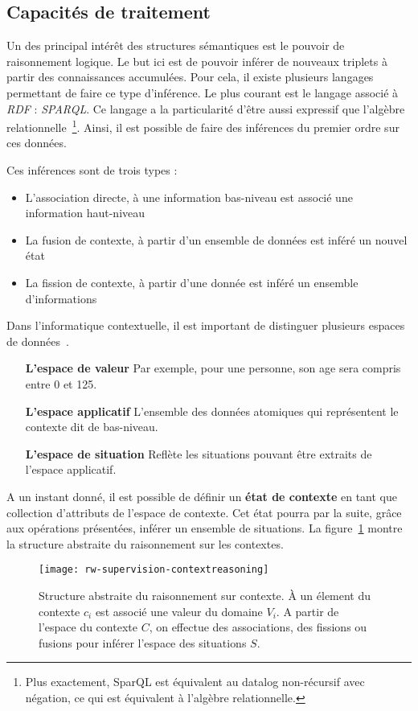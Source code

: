 \subsection{Capacités de traitement}
Un des principal intérêt des structures sémantiques est le pouvoir de raisonnement logique. Le but ici est de pouvoir inférer de nouveaux triplets à partir des connaissances accumulées. Pour cela, il existe plusieurs langages permettant de faire ce type d'inférence. Le plus courant est le langage associé à \textit{RDF} : \textit{SPARQL}. Ce langage a la particularité d'être aussi expressif que l'algèbre relationnelle~\cite{Angles:sparql}\footnote{Plus exactement, SparQL est équivalent au datalog non-récursif avec négation, ce qui est équivalent à l'algèbre relationnelle.}. Ainsi, il est possible de faire des inférences du premier ordre sur ces données.

Ces inférences sont de trois types :
\begin{itemize}
 \item L'association directe, à une information bas-niveau est associé une information haut-niveau 
 \item La fusion de contexte, à partir d'un ensemble de données est inféré un nouvel état 
 \item La fission de contexte, à partir d'une donnée est inféré un ensemble d'informations
\end{itemize}

Dans l'informatique contextuelle, il est important de distinguer plusieurs espaces de données~\cite{Padovitz:agent}. 
\begin{itemize}
 \item[\textbf{L'espace de valeur}] Par exemple, pour une personne, son age sera compris entre 0 et 125.
 \item[\textbf{L'espace applicatif}] L'ensemble des données atomiques qui représentent le contexte dit de bas-niveau.
 \item[\textbf{L'espace de situation}] Reflète les situations pouvant être extraits de l'espace applicatif.
\end{itemize}

A un instant donné, il est possible de définir un \textbf{état de contexte} en tant que collection d'attributs de l'espace de contexte. Cet état pourra par la suite, grâce aux opérations présentées, inférer un ensemble de situations. La figure~\ref{rw-supervision-contextreasoning} montre la structure abstraite du raisonnement sur les contextes.
\begin{figure}[ht]
    \centering
    \texttt{[image: rw-supervision-contextreasoning]}
    \caption{Structure abstraite du raisonnement sur contexte. À un élement du contexte $c_i$ est associé une valeur du domaine $V_i$. A partir de l'espace du contexte $C$, on effectue des associations, des fissions ou fusions pour inférer l'espace des situations $S$.}\label{rw-supervision-contextreasoning}
\end{figure}

